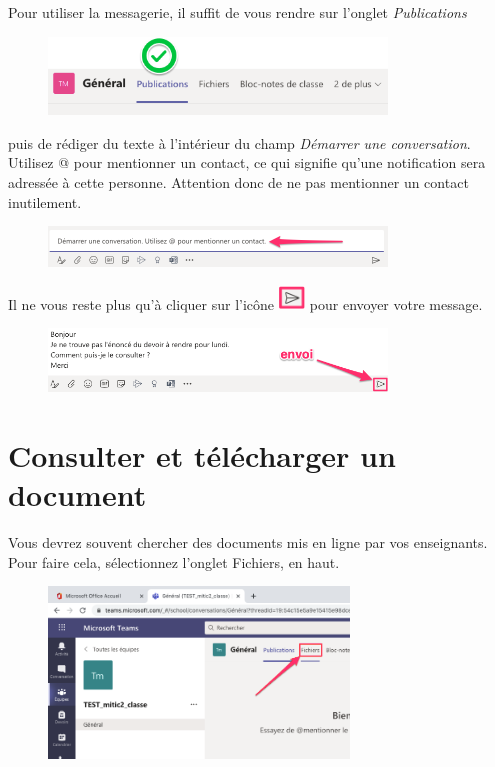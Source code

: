 Pour utiliser la messagerie, il suffit de vous rendre sur l'onglet \textit{Publications}

\begin{figure}[H]
\includegraphics[width=9cm]{./images/teams/publications}
\centering
\end{figure}

puis de rédiger du texte à l'intérieur du champ \textit{Démarrer une conversation}. Utilisez @ pour mentionner un contact, ce qui signifie qu'une notification sera adressée à cette personne. Attention donc de ne pas mentionner un contact inutilement.

\begin{figure}[H]
\includegraphics[width=9cm]{./images/teams/publications2}
\centering
\end{figure}

Il ne vous reste plus qu'à cliquer sur l'icône \includegraphics[width=0.7cm]{./images/teams/envoi_message} pour envoyer votre message.

\begin{figure}[H]
\includegraphics[width=9cm]{./images/teams/publications3}
\centering
\end{figure}





\section{Consulter et télécharger un document}

Vous devrez souvent chercher des documents mis en ligne par vos enseignants. Pour faire cela, sélectionnez l'onglet Fichiers, en haut.

\begin{figure}[H]
	\includegraphics[width=8cm]{./images/teams/accueil_classe_crop}
	\centering
\end{figure}

